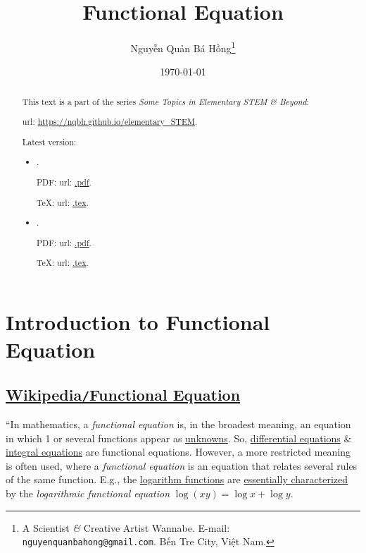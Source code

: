 \documentclass{article}
\title{Functional Equation}
\author{Nguyễn Quản Bá Hồng\footnote{A Scientist {\it\&} Creative Artist Wannabe. E-mail: {\tt nguyenquanbahong@gmail.com}. Bến Tre City, Việt Nam.}}
\date{\today}
\begin{document}
\maketitle
\begin{abstract}
	This text is a part of the series {\it Some Topics in Elementary STEM \& Beyond}:
	
	{\sc url}: \url{https://nqbh.github.io/elementary_STEM}.
	
	Latest version:
	\begin{itemize}
		\item {\it }.
		
		PDF: {\sc url}: \url{.pdf}.
		
		\TeX: {\sc url}: \url{.tex}.
		\item {\it }.
		
		PDF: {\sc url}: \url{.pdf}.
		
		\TeX: {\sc url}: \url{.tex}.
	\end{itemize}
\end{abstract}
\tableofcontents


\section{Introduction to Functional Equation}

\subsection{\href{https://en.wikipedia.org/wiki/Functional_equation}{Wikipedia\texttt{/}Functional Equation}}
``In mathematics, a \textit{functional equation} is, in the broadest meaning, an equation in which 1 or several functions appear as \href{https://en.wikipedia.org/wiki/Unknown_(mathematics)}{unknowns}. So, \href{https://en.wikipedia.org/wiki/Differential_equation}{differential equations} \& \href{https://en.wikipedia.org/wiki/Integral_equation}{integral equations} are functional equations. However, a more restricted meaning is often used, where a \textit{functional equation} is an equation that relates several rules of the same function. E.g., the \href{https://en.wikipedia.org/wiki/Logarithm_function}{logarithm functions} are \href{https://en.wikipedia.org/wiki/Logarithm#Characterization_by_the_product_formula}{essentially characterized} by the \textit{logarithmic functional equation} $\log(xy) = \log x + \log y$.
\end{document}
